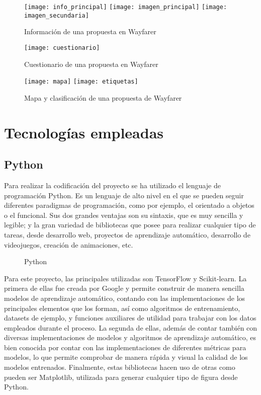 	\begin{figure}[!h]
		\centering
		\texttt{[image: info\_principal]}\hfill
		\texttt{[image: imagen\_principal]}\hfill
		\texttt{[image: imagen\_secundaria]}
		\caption{Información de una propuesta en Wayfarer}
		\label{fig:info_propuesta}
	\end{figure}
	
	\begin{figure}[!h]
		\centering
		\texttt{[image: cuestionario]}
		\caption{Cuestionario de una propuesta en Wayfarer}
		\label{fig:preguntas}
	\end{figure}
	
	\begin{figure}[!h]
		\centering
		\texttt{[image: mapa]}\hfill
		\texttt{[image: etiquetas]}
		\caption{Mapa y clasificación de una propuesta de Wayfarer}
		\label{fig:mapa}
	\end{figure}
	
	\section{Tecnologías empleadas}
	
		\subsection{Python}
		
			Para realizar la codificación del proyecto se ha utilizado el lenguaje de programación Python. Es un lenguaje de alto nivel en el que se pueden seguir diferentes paradigmas de programación, como por ejemplo, el orientado a objetos o el funcional. Sus dos grandes ventajas son su sintaxis, que es muy sencilla y legible; y la gran variedad de bibliotecas que posee para realizar cualquier tipo de tareas, desde desarrollo web, proyectos de aprendizaje automático, desarrollo de videojuegos, creación de animaciones, etc. \\
			
			\begin{figure}[!h]
				\centering
				
				\caption{Python}
				\label{fig:py}
			\end{figure}
			
			Para este proyecto, las principales utilizadas son TensorFlow y Scikit-learn. La primera de ellas fue creada por Google y permite construir de manera sencilla modelos de aprendizaje automático, contando con las implementaciones de los principales elementos que los forman, así como algoritmos de entrenamiento, datasets de ejemplo, y funciones auxiliares de utilidad para trabajar con los datos empleados durante el proceso. La segunda de ellas, además de contar también con diversas implementaciones de modelos y algoritmos de aprendizaje automático, es bien conocida por contar con las implementaciones de diferentes métricas para modelos, lo que permite comprobar de manera rápida y visual la calidad de los modelos entrenados. Finalmente, estas bibliotecas hacen uso de otras como pueden ser Matplotlib, utilizada para generar cualquier tipo de figura desde Python. \\
			
